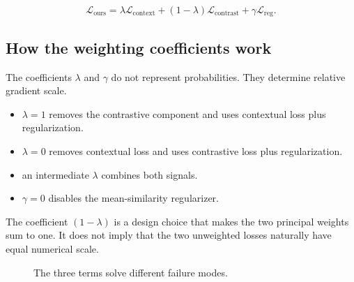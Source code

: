 \documentclass[11pt,oneside,openany]{book}
\theoremstyle{myplain}
\theoremstyle{definition}
\newcommand{\paperEq}[1]{\tag{P#1}}
\begin{document}
\begin{equation*}
  \boxed{
  \mathcal L_{\mathrm{ours}}
  =\lambda\mathcal L_{\mathrm{context}}
  +(1-\lambda)\mathcal L_{\mathrm{contrast}}
  +\gamma\mathcal L_{\mathrm{reg}}.}
\paperEq{6}
\label{eq:full-objective}
\end{equation*}

\subsection{How the weighting coefficients work}

The coefficients $\lambda$ and $\gamma$ do not represent probabilities. They determine relative gradient scale.

\begin{itemize}[leftmargin=*]
  \item $\lambda=1$ removes the contrastive component and uses contextual loss plus regularization.
  \item $\lambda=0$ removes contextual loss and uses contrastive loss plus regularization.
  \item an intermediate $\lambda$ combines both signals.
  \item $\gamma=0$ disables the mean-similarity regularizer.
\end{itemize}

The coefficient $(1-\lambda)$ is a design choice that makes the two principal weights sum to one. It does not imply that the two unweighted losses naturally have equal numerical scale.


\begin{figure}[H]
\centering
{}
\caption{The three terms solve different failure modes.}
\label{fig:loss-roles}
\end{figure}
\end{document}
